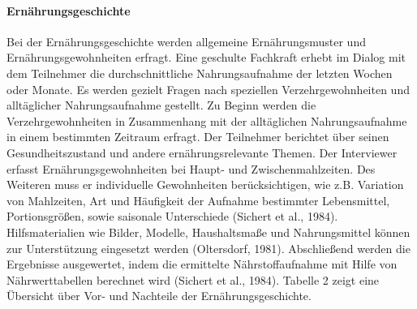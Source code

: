 \paragraph{Ernährungsgeschichte}
Bei der Ernährungsgeschichte werden allgemeine Ernährungsmuster und Ernährungsgewohnheiten erfragt. Eine geschulte Fachkraft erhebt im Dialog mit dem Teilnehmer die durchschnittliche Nahrungsaufnahme der letzten Wochen oder Monate. Es werden gezielt Fragen nach speziellen Verzehrgewohnheiten und alltäglicher Nahrungsaufnahme gestellt. Zu Beginn werden die Verzehrgewohnheiten in Zusammenhang mit der alltäglichen Nahrungsaufnahme in einem bestimmten Zeitraum erfragt. Der Teilnehmer berichtet über  seinen Gesundheitszustand und andere ernährungsrelevante Themen. Der Interviewer erfasst Ernährungsgewohnheiten bei Haupt- und Zwischenmahlzeiten. Des Weiteren muss er individuelle Gewohnheiten berücksichtigen, wie z.B. Variation von Mahlzeiten, Art und Häufigkeit der Aufnahme bestimmter Lebensmittel, Portionsgrößen, sowie saisonale Unterschiede (Sichert et al., 1984). Hilfsmaterialien wie Bilder, Modelle, Haushaltsmaße und Nahrungsmittel können zur Unterstützung eingesetzt werden (Oltersdorf, 1981). Abschließend werden die Ergebnisse ausgewertet, indem die ermittelte Nährstoffaufnahme mit Hilfe von Nährwerttabellen berechnet wird (Sichert et al., 1984). 
Tabelle 2 zeigt eine Übersicht über Vor- und Nachteile der Ernährungsgeschichte.



